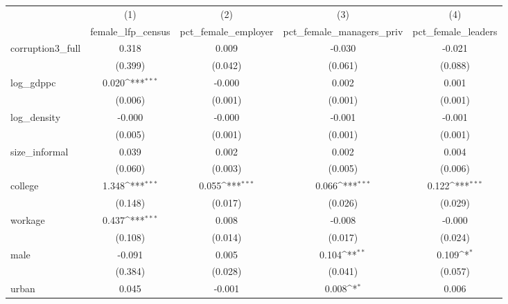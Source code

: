 {
\def\sym#1{\ifmmode^{#1}\else\(^{#1}\)\fi}
\begin{tabular}{l*{4}{c}}
\hline\hline
            &\multicolumn{1}{c}{(1)}&\multicolumn{1}{c}{(2)}&\multicolumn{1}{c}{(3)}&\multicolumn{1}{c}{(4)}\\
            &\multicolumn{1}{c}{female\_lfp\_census}&\multicolumn{1}{c}{pct\_female\_employer}&\multicolumn{1}{c}{pct\_female\_managers\_priv}&\multicolumn{1}{c}{pct\_female\_leaders}\\
\hline
corruption3\_full&       0.318         &       0.009         &      -0.030         &      -0.021         \\
            &     (0.399)         &     (0.042)         &     (0.061)         &     (0.088)         \\
[1em]
log\_gdppc   &       0.020\sym{***}&      -0.000         &       0.002         &       0.001         \\
            &     (0.006)         &     (0.001)         &     (0.001)         &     (0.001)         \\
[1em]
log\_density &      -0.000         &      -0.000         &      -0.001         &      -0.001         \\
            &     (0.005)         &     (0.001)         &     (0.001)         &     (0.001)         \\
[1em]
size\_informal&       0.039         &       0.002         &       0.002         &       0.004         \\
            &     (0.060)         &     (0.003)         &     (0.005)         &     (0.006)         \\
[1em]
college     &       1.348\sym{***}&       0.055\sym{***}&       0.066\sym{***}&       0.122\sym{***}\\
            &     (0.148)         &     (0.017)         &     (0.026)         &     (0.029)         \\
[1em]
workage     &       0.437\sym{***}&       0.008         &      -0.008         &      -0.000         \\
            &     (0.108)         &     (0.014)         &     (0.017)         &     (0.024)         \\
[1em]
male        &      -0.091         &       0.005         &       0.104\sym{**} &       0.109\sym{*}  \\
            &     (0.384)         &     (0.028)         &     (0.041)         &     (0.057)         \\
[1em]
urban       &       0.045         &      -0.001         &       0.008\sym{*}  &       0.006         \\

\end{tabular}}
